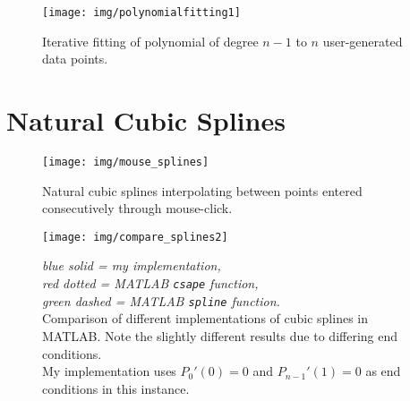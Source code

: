 \documentclass{scrartcl}
\begin{document}
\begin{figure}[H]
	\texttt{[image: img/polynomialfitting1]}
	\caption{
		Iterative fitting of polynomial of degree $n-1$ to $n$ user-generated data points.
	}
	\label{fig:regression3}
\end{figure}

\section{Natural Cubic Splines}
\begin{figure}[H]
	\texttt{[image: img/mouse\_splines]}
	\caption{
		Natural cubic splines interpolating between points entered consecutively through mouse-click.
	}
	\label{fig:splines1}
\end{figure}
\begin{figure}[H]
	\texttt{[image: img/compare\_splines2]}
	\caption{
		{\footnotesize \textit{blue solid = my implementation, \\red dotted = \emph{MATLAB \texttt{csape}} function,\\green dashed = \emph{MATLAB \texttt{spline}} function.}}\\
		Comparison of different implementations of cubic splines in MATLAB. Note the slightly different results due to differing end conditions.\\My implementation uses $P_0'(0)=0$ and $P_{n-1}'(1)=0$ as end conditions in this instance.
	}
	\label{fig:splines2}
\end{figure}
\end{document}
